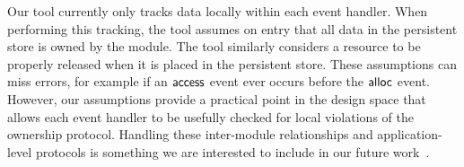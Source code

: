 Our tool currently only tracks data locally within each event handler.
When performing this tracking, the tool assumes on entry that all data
in the persistent store is owned by the module.  The tool similarly
considers a resource to be properly released when it is placed in the
persistent store.  These assumptions can miss errors, for example if
an ${\mathsf{access}}$ event ever occurs before the ${\mathsf{alloc}}$ event.  However,
our assumptions provide a practical point in the design space that
allows each event handler to be usefully checked for local violations
of the ownership protocol.
%
Handling these inter-module relationships and application-level
protocols is something we are interested to include in our future
work~\cite{AlurPOPL05,HJM05}.
%


